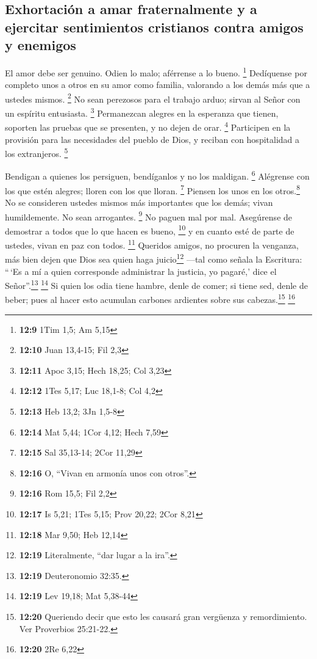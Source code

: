 \hypertarget{exhortaciuxf3n-a-amar-fraternalmente-y-a-ejercitar-sentimientos-cristianos-contra-amigos-y-enemigos}{%
\subsection{Exhortación a amar fraternalmente y a ejercitar sentimientos
cristianos contra amigos y
enemigos}\label{exhortaciuxf3n-a-amar-fraternalmente-y-a-ejercitar-sentimientos-cristianos-contra-amigos-y-enemigos}}

 El amor debe ser genuino. Odien lo malo; aférrense a lo
bueno. \footnote{\textbf{12:9} 1Tim 1,5; Am 5,15} 
Dedíquense por completo unos a otros en su amor como familia, valorando
a los demás más que a ustedes mismos. \footnote{\textbf{12:10} Juan
  13,4-15; Fil 2,3}  No sean perezosos para el trabajo
arduo; sirvan al Señor con un espíritu entusiasta. \footnote{\textbf{12:11}
  Apoc 3,15; Hech 18,25; Col 3,23}  Permanezcan alegres
en la esperanza que tienen, soporten las pruebas que se presenten, y no
dejen de orar. \footnote{\textbf{12:12} 1Tes 5,17; Luc 18,1-8; Col 4,2}
 Participen en la provisión para las necesidades del
pueblo de Dios, y reciban con hospitalidad a los extranjeros.
\footnote{\textbf{12:13} Heb 13,2; 3Jn 1,5-8}

 Bendigan a quienes los persiguen, bendíganlos y no los
maldigan. \footnote{\textbf{12:14} Mat 5,44; 1Cor 4,12; Hech 7,59}
 Alégrense con los que estén alegres; lloren con los que
lloran. \footnote{\textbf{12:15} Sal 35,13-14; 2Cor 11,29}
 Piensen los unos en los otros.\footnote{\textbf{12:16}
  O, ``Vivan en armonía unos con otros''.} No se consideren ustedes
mismos más importantes que los demás; vivan humildemente. No sean
arrogantes. \footnote{\textbf{12:16} Rom 15,5; Fil 2,2} 
No paguen mal por mal. Asegúrense de demostrar a todos que lo que hacen
es bueno, \footnote{\textbf{12:17} Is 5,21; 1Tes 5,15; Prov 20,22; 2Cor
  8,21}  y en cuanto esté de parte de ustedes, vivan en
paz con todos. \footnote{\textbf{12:18} Mar 9,50; Heb 12,14}
 Queridos amigos, no procuren la venganza, más bien dejen
que Dios sea quien haga juicio\footnote{\textbf{12:19} Literalmente,
  ``dar lugar a la ira''.} ---tal como señala la Escritura: ``\,`Es a mí
a quien corresponde administrar la justicia, yo pagaré,' dice el
Señor''.\footnote{\textbf{12:19} Deuteronomio 32:35.} \footnote{\textbf{12:19}
  Lev 19,18; Mat 5,38-44}  Si quien los odia tiene
hambre, denle de comer; si tiene sed, denle de beber; pues al hacer esto
acumulan carbones ardientes sobre sus cabezas.\footnote{\textbf{12:20}
  Queriendo decir que esto les causará gran vergüenza y remordimiento.
  Ver Proverbios 25:21-22.} \footnote{\textbf{12:20} 2Re 6,22}

